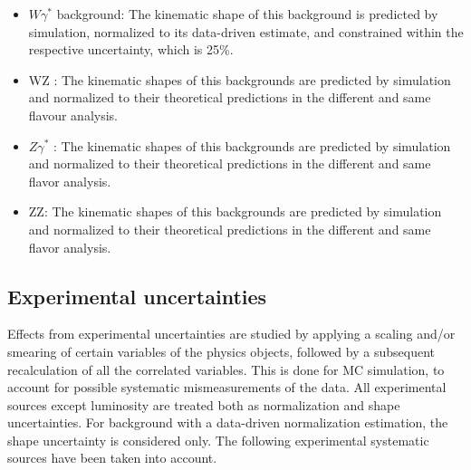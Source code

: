 \begin{itemize}
\item $W \gamma^*$ background: The kinematic shape of this background is predicted by simulation, normalized to its data-driven estimate, and constrained within the respective
uncertainty, which is 25\%.
\item WZ : The kinematic shapes of this backgrounds are predicted by simulation and
normalized to their theoretical predictions in the different and same flavour analysis.

\item $ Z \gamma^*$  : The kinematic shapes of this backgrounds are predicted by simulation and
normalized to their theoretical predictions in the different and same flavor analysis.

\item ZZ: The kinematic shapes of this backgrounds are predicted by simulation and normalized to their theoretical predictions in the different and same flavor analysis.

\end{itemize}




\subsection*{Experimental uncertainties}
Effects from experimental uncertainties are studied by applying a scaling and/or smearing of
certain variables of the physics objects, followed by a subsequent recalculation of all the correlated variables. This is done for MC simulation, to account for possible systematic mismeasurements of the data. All experimental sources except luminosity are treated both as normalization and shape uncertainties. For background with a data-driven normalization estimation,
the shape uncertainty is considered only. The following experimental systematic sources have
been taken into account.

